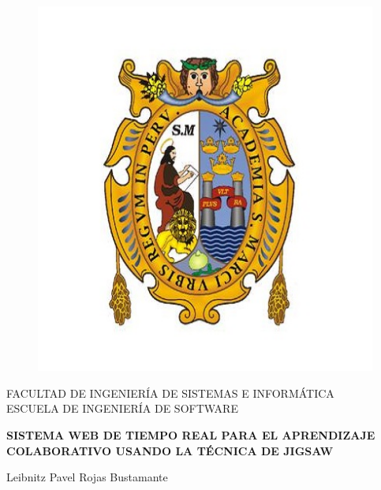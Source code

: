 \begin{titlepage}
\title{}
\author{Leibnitz Pavel Rojas Bustamante}
\begin{center}
    \vspace*{-1in}
    \begin{figure}[htb]
        \begin{center}
            \includegraphics[scale=0.5]{./figuras/escudo_unmsm.jpg}
        \end{center}
    \end{figure}
    FACULTAD DE INGENIERÍA DE SISTEMAS E INFORMÁTICA\\
    \vspace*{0.15in}
    ESCUELA DE INGENIERÍA DE SOFTWARE \\
    \vspace*{0.6in}
    \begin{large}
    \end{large}
    \vspace*{0.2in}
    \begin{Large}
    \textbf{SISTEMA WEB DE TIEMPO REAL PARA EL APRENDIZAJE COLABORATIVO USANDO LA TÉCNICA DE JIGSAW} \\
    \end{Large}
    \vspace*{0.3in}
    \begin{center}
        Leibnitz Pavel Rojas Bustamante
    \end{center}

\end{center}
\end{titlepage}

